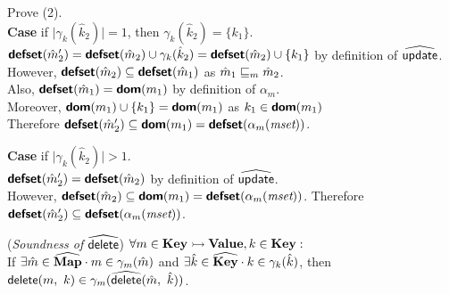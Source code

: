 \begin{itemize}
Prove (2).\\
\textbf{Case} if $\mid \gamma_k(\hat{k}_2) \mid = 1$, then $\gamma_k(\hat{k}_2) = \{ k_1 \}$.\\
$\textsf{\textbf{defset}}(\hat{m}_2') = \textsf{\textbf{defset}}(\hat{m}_2) \cup \gamma_k(\hat{k}_2)
= \textsf{\textbf{defset}}(\hat{m}_2) \cup \{ k_1 \}$ by definition of $\widehat{\textsf{update}}$.\\
However, $\textsf{\textbf{defset}}(\hat{m}_2) \subseteq \textsf{\textbf{defset}}(\hat{m}_1)$ as $\hat{m}_1 \sqsubseteq_m \hat{m}_2$.\\
Also, $\textsf{\textbf{defset}}(\hat{m}_1) = \textsf{\textbf{dom}}(m_1)$ by definition of $\alpha_m$.\\
Moreover, $\textsf{\textbf{dom}}(m_1) \cup \{ k_1 \} = \textsf{\textbf{dom}}(m_1)$ as $k_1 \in \textsf{\textbf{dom}}(m_1)$ \\
Therefore $\textsf{\textbf{defset}}(\hat{m}_2') \subseteq \textsf{\textbf{dom}}(m_1) = \textsf{\textbf{defset}}(\alpha_m(\emph{mset}))$.

\textbf{Case} if $\mid \gamma_k(\hat{k}_2) \mid > 1$.\\
$\textsf{\textbf{defset}}(\hat{m}_2') = \textsf{\textbf{defset}}(\hat{m}_2)$ by definition of $\widehat{\textsf{update}}$.\\
However, $\textsf{\textbf{defset}}(\hat{m}_2) \subseteq \textsf{\textbf{dom}}(m_1) = \textsf{\textbf{defset}}(\alpha_m(\emph{mset}))$.
Therefore $\textsf{\textbf{defset}}(\hat{m}_2') \subseteq \textsf{\textbf{defset}}(\alpha_m(\emph{mset}))$.
\end{itemize}


\begin{thm} \normalfont
(\textit{Soundness of} $\widehat{\textsf{delete}}$) 
$\forall m \in \textbf{Key} \rightarrowtail \textbf{Value}, k \in \textbf{Key} :$\\
If $\exists \hat{m} \in \widehat{\textbf{Map}} \cdot m \in \gamma_m(\hat{m})$
and $\exists \hat{k} \in \widehat{\textbf{Key}} \cdot k \in \gamma_k(\hat{k})$,
then $\textsf{delete}(m,\ k) \in \gamma_m(\widehat{\textsf{delete}}(\hat{m},\ \hat{k}))$.
\end{thm}
